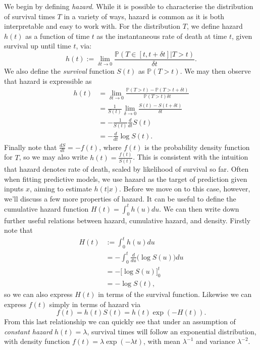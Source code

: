\documentclass[../thesis.tex]{subfiles}
\begin{document}
We begin by defining \textit{hazard}. While it is possible to characterise the distribution of survival times $T$ in a variety of ways, hazard is common as it is both interpretable and easy to work with. For the distribution $T$, we define hazard $h(t)$ as a function of time $t$ as the instantaneous rate of death at time $t$, given survival up until time $t$, via:
\[
    h(t) := \lim_{\delta t \rightarrow 0} \frac{\mathbb{P}(T \in [t, t + \delta t] | T > t)}{\delta t}.
\]
We also define the \textit{survival} function $S(t)$ as $\mathbb{P}(T > t)$. We may then observe that hazard is expressible as 
\begin{align*}
    h(t) & = \lim_{\delta t \rightarrow 0} \frac{\mathbb{P}(T > t) - \mathbb{P}(T > t + \delta t)}{\mathbb{P}(T > t) \delta t} \\
    & = \frac{1}{S(t)} \lim_{\delta \rightarrow 0} \frac{S(t) - S(t + \delta t)}{\delta t}\\
    & = - \frac{1}{S(t)} \frac{d}{dt} S(t)\\
    & = - \frac{d}{dt} \log S(t). 
\end{align*}
Finally note that $\frac{dS}{dt} = - f(t)$, where $f(t)$ is the probability density function for $T$, so we may also write $h(t) = \frac{f(t)}{S(t)}$. This is consistent with the intuition that hazard denotes rate of death, scaled by likelihood of survival so far. Often when fitting predictive models, we use hazard as the target of prediction given inputs $x$, aiming to estimate $h(t|x)$. Before we move on to this case, however, we'll discuss a few more properties of hazard. It can be useful to define the cumulative hazard function $H(t) = \int_{0}^{t}h(u)du$. We can then write down further useful relations between hazard, cumulative hazard, and density. Firstly note that 
\begin{align*}
H(t) & := \int_{0}^{t}h(u)du \\
& = -\int_{0}^{t}\frac{d}{du} \big(\log S(u)\big) du  \\
& = - \big[\log S(u) \big]_{0}^{t} \\
& = -\log S(t),
\end{align*}
so we can also express $H(t)$ in terms of the survival function. Likewise we can express $f(t)$ simply in terms of hazard via
\[ f(t) = h(t)S(t) = h(t)\exp (-H(t)).\]
From this last relationship we can quickly see that under an assumption of \emph{constant hazard} $h(t)=\lambda$, survival times will follow an exponential distribution, with density function $f(t) = \lambda \exp(-\lambda t)$, with mean $\lambda^{-1}$ and variance $\lambda^{-2}$.
\end{document}

